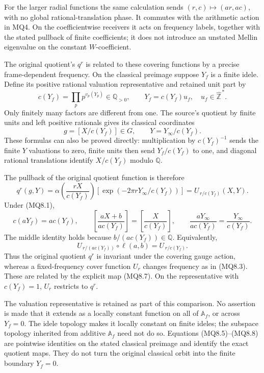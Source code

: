 For the larger radial functions the same calculation sends
\((r,c)\mapsto(ar,ac)\), with no global rational-translation phase. It
commutes with the arithmetic action in MQ4. On the coefficientwise
receivers it acts on frequency labels, together with the stated pullback
of finite coefficients; it does not introduce an unstated Mellin
eigenvalue on the constant \(W\)-coefficient.

The original quotient's \(q^r\) is related to these covering functions
by a precise frame-dependent frequency. On the classical preimage
suppose \(Y_f\) is a finite idele. Define its positive rational
valuation representative and retained unit part by \[
c(Y_f)=\prod_p p^{v_p(Y_p)}\in\mathbb Q_{>0},
\qquad Y_f=c(Y_f)u_f,\quad u_f\in\widehat{\mathbb Z}^{\,*}.
\tag{MQ8.5}
\] Only finitely many factors are different from one. The source's
quotient by finite units and left positive rationals gives its classical
coordinates \[
g=[X/c(Y_f)]\in G,\qquad
Y=Y_\infty/c(Y_f).
\tag{MQ8.6}
\] These formulas can also be proved directly: multiplication by
\(c(Y_f)^{-1}\) sends the finite \(Y\) valuations to zero, finite units
then send \(Y_f/c(Y_f)\) to one, and diagonal rational translations
identify \(X/c(Y_f)\) modulo \(\mathbb Q\).

The pullback of the original quotient function is therefore \[
\boxed{
q^r(g,Y)=
\alpha\!\left(\frac{rX}{c(Y_f)}\right)
[\exp(-2\pi rY_\infty/c(Y_f))]
=U_{\,r/c(Y_f)}(X,Y).}
\tag{MQ8.7}
\] Under (MQ8.1), \[
c(aY_f)=ac(Y_f),\qquad
\left[\frac{aX+b}{ac(Y_f)}\right]
=\left[\frac{X}{c(Y_f)}\right],\qquad
\frac{aY_\infty}{ac(Y_f)}=\frac{Y_\infty}{c(Y_f)}.
\] The middle identity holds because \(b/(ac(Y_f))\in\mathbb Q\).
Equivalently, \[
U_{\,r/(ac(Y_f))}\circ\ell(a,b)
=U_{\,r/c(Y_f)}.
\tag{MQ8.8}
\] Thus the original quotient \(q^r\) is invariant under the covering
gauge action, whereas a fixed-frequency cover function \(U_r\) changes
frequency as in (MQ8.3). These are related by the explicit map (MQ8.7).
On the representative with \(c(Y_f)=1\), \(U_r\) restricts to \(q^r\).

The valuation representative is retained as part of this comparison. No
assertion is made that it extends as a locally constant function on all
of \(\mathbb A_f\), or across \(Y_f=0\). The idele topology makes it
locally constant on finite ideles; the subspace topology inherited from
additive \(\mathbb A_f\) need not do so. Equations (MQ8.5)--(MQ8.8) are
pointwise identities on the stated classical preimage and identify the
exact quotient maps. They do not turn the original classical orbit into
the finite boundary \(Y_f=0\).

